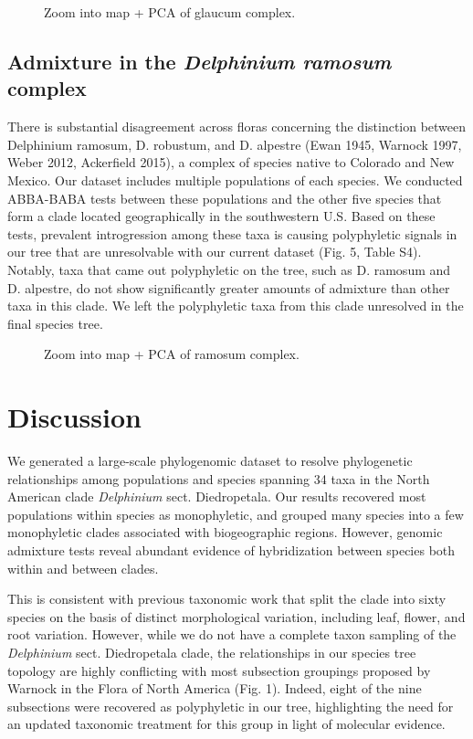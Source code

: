 \documentclass[11pt]{article}
\begin{document}
\begin{figure}[t]
	\centering
	\caption{
        Zoom into map + PCA of glaucum complex.
	}
	\label{fig:5}
\end{figure}



\subsection{Admixture in the \emph{Delphinium ramosum} complex}
There is substantial disagreement across floras concerning the distinction between Delphinium ramosum, D. robustum, and D. alpestre (Ewan 1945, Warnock 1997, Weber 2012, Ackerfield 2015), a complex of species native to Colorado and New Mexico. Our dataset includes multiple populations of each species. We conducted ABBA-BABA tests between these populations and the other five species that form a clade located geographically in the southwestern U.S. Based on these tests, prevalent introgression among these taxa is causing polyphyletic signals in our tree that are unresolvable with our current dataset (Fig. 5, Table S4). Notably, taxa that came out polyphyletic on the tree, such as D. ramosum and D. alpestre, do not show significantly greater amounts of admixture than other taxa in this clade. We left the polyphyletic taxa from this clade unresolved in the final species tree.


\begin{figure}[t]
	\centering
	\caption{
        Zoom into map + PCA of ramosum complex.
	}
	\label{fig:6}
\end{figure}



\section{Discussion}

We generated a large-scale phylogenomic dataset to resolve phylogenetic relationships 
among populations and species spanning 34 taxa in the North American clade \emph{Delphinium}
sect. Diedropetala. Our results recovered most populations within species as monophyletic,
and grouped many species into a few monophyletic clades associated with biogeographic regions.
However, genomic admixture tests reveal abundant evidence of hybridization between species both
within and between clades. 

This is consistent with previous taxonomic work that split the clade into sixty species 
on the basis of distinct morphological variation, including leaf, flower, and root variation.
However, while we do not have a complete taxon sampling of the \emph{Delphinium} sect. 
Diedropetala clade, the relationships in our species tree topology are highly conflicting 
with most subsection groupings proposed by Warnock in the Flora of North America (Fig. 1).
Indeed, eight of the nine subsections were recovered as polyphyletic in our tree, 
highlighting the need for an updated taxonomic treatment for this group in light of
molecular evidence.
\end{document}
